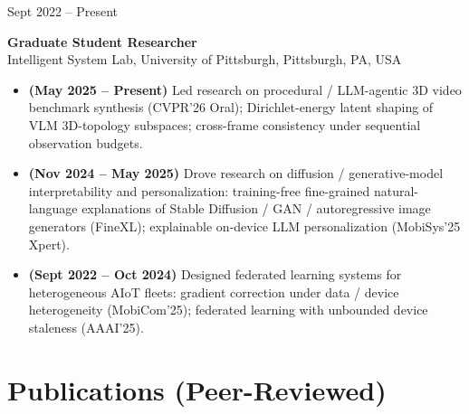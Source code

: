 \documentclass[11pt, letterpaper]{article}
\newenvironment{datedentry}[1]{%
  \par\noindent
  \begin{minipage}[t]{2.8cm}\raggedright\small #1\end{minipage}%
  \hspace{0.3cm}%
  \begin{minipage}[t]{\dimexpr\linewidth-3.1cm\relax}\raggedright
}{\end{minipage}\par\medskip}
\begin{document}
\begin{datedentry}{Sept 2022 -- Present}
\textbf{Graduate Student Researcher}\\
Intelligent System Lab, University of Pittsburgh, Pittsburgh, PA, USA
\begin{itemize}[leftmargin=1.1em, itemsep=2pt, topsep=3pt]
  \item \textbf{(May 2025 -- Present)} Led research on procedural / LLM-agentic 3D video benchmark synthesis (CVPR'26 Oral); Dirichlet-energy latent shaping of VLM 3D-topology subspaces; cross-frame consistency under sequential observation budgets.
  \item \textbf{(Nov 2024 -- May 2025)} Drove research on diffusion / generative-model interpretability and personalization: training-free fine-grained natural-language explanations of Stable Diffusion / GAN / autoregressive image generators (FineXL); explainable on-device LLM personalization (MobiSys'25 Xpert).
  \item \textbf{(Sept 2022 -- Oct 2024)} Designed federated learning systems for heterogeneous AIoT fleets: gradient correction under data / device heterogeneity (MobiCom'25); federated learning with unbounded device staleness (AAAI'25).
\end{itemize}
\end{datedentry}

\section{Publications (Peer-Reviewed)}
\end{document}
